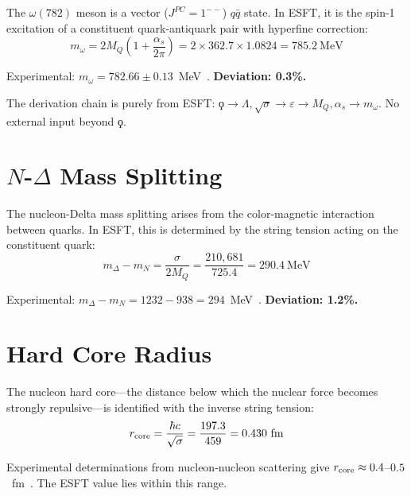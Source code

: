 ﻿\documentclass[twocolumn,showpacs,preprintnumbers,amsmath,amssymb,prc]{revtex4-2}
\begin{document}
The $\omega(782)$ meson is a vector ($J^{PC} = 1^{--}$) $q\bar{q}$ state. In ESFT, it is the spin-1 excitation of a constituent quark-antiquark pair with hyperfine correction:
\begin{equation}
m_\omega = 2M_Q\left(1 + \frac{\alpha_s}{2\pi}\right) = 2 \times 362.7 \times 1.0824 = 785.2~\text{MeV}
\label{eq:momega}
\end{equation}

Experimental: $m_\omega = 782.66 \pm 0.13$~MeV~\cite{PDG2024}. \textbf{Deviation: 0.3\%.}

The derivation chain is purely from ESFT: $\koppa \to \Lambda, \sqrt{\sigma} \to \varepsilon \to M_Q, \alpha_s \to m_\omega$. No external input beyond $\koppa$.

\section{$N$-$\Delta$ Mass Splitting}
\label{sec:ndelta}

The nucleon-Delta mass splitting arises from the color-magnetic interaction between quarks. In ESFT, this is determined by the string tension acting on the constituent quark:
\begin{equation}
m_\Delta - m_N = \frac{\sigma}{2M_Q} = \frac{210{,}681}{725.4} = 290.4~\text{MeV}
\label{eq:ndelta}
\end{equation}

Experimental: $m_\Delta - m_N = 1232 - 938 = 294$~MeV~\cite{PDG2024}. \textbf{Deviation: 1.2\%.}

\section{Hard Core Radius}
\label{sec:hardcore}

The nucleon hard core---the distance below which the nuclear force becomes strongly repulsive---is identified with the inverse string tension:
\begin{equation}
r_{\rm core} = \frac{\hbar c}{\sqrt{\sigma}} = \frac{197.3}{459} = 0.430~\text{fm}
\label{eq:rcore}
\end{equation}

Experimental determinations from nucleon-nucleon scattering give $r_{\rm core} \approx 0.4$--$0.5$~fm~\cite{Reid1968,Wiringa1995}. The ESFT value lies within this range.
\end{document}
